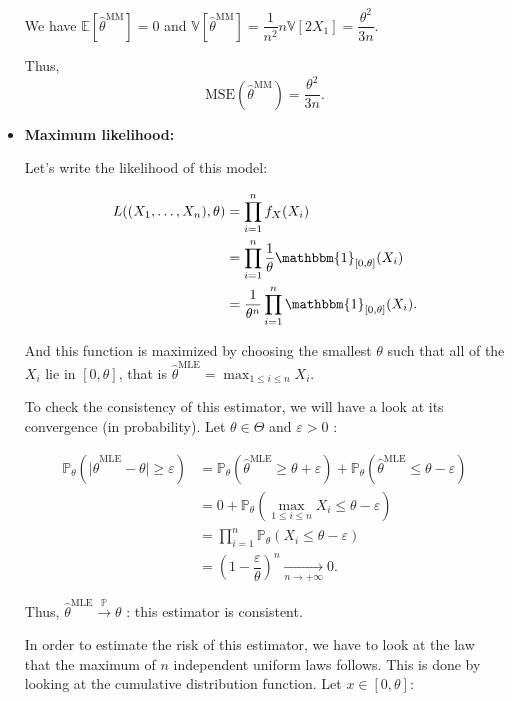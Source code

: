 \begin{itemize}
We have $\mathbb{E}[\hat{\theta}^{\text{MM}}] = 0$ and $\mathbb{V}[\hat{\theta}^{\text{MM}}] = \dfrac{1}{n^2}n\mathbb{V}[2X_1] = \dfrac{\theta^2}{3n}.$\newline

Thus, $$\text{MSE}(\hat{\theta}^{\text{MM}}) = \dfrac{\theta^2}{3n}.$$


\item \textbf{Maximum likelihood:}

Let's write the likelihood of this model:

\begin{align*}
    L((X_1,\dots,X_n), \theta) &= \displaystyle \prod_{i=1}^{n} f_X(X_i) \\
    &= \displaystyle \prod_{i=1}^{n} \dfrac{1}{\theta} \mathbbm{1}_{[0, \theta]}(X_i)\\
    &= \dfrac{1}{\theta^n} \prod_{i=1}^{n} \mathbbm{1}_{[0, \theta]}(X_i).
\end{align*}

And this function is maximized by choosing the smallest $\theta$ such that all of the $X_i$ lie in $[0, \theta]$, that is $\hat{\theta}^{\text{MLE}} = \max_{1\leq i \leq n} X_i.$\newline

To check the consistency of this estimator, we will have a look at its convergence (in probability). Let $\theta \in \Theta$ and $\varepsilon >0$ :

\begin{align*}
    \mathbb{P}_\theta(\lvert\hat{\theta}^{\text{MLE}} - \theta\rvert \ge \varepsilon) &= \mathbb{P}_\theta(\hat{\theta}^{\text{MLE}} \ge \theta + \varepsilon) + \mathbb{P}_\theta(\hat{\theta}^{\text{MLE}} \le \theta - \varepsilon)\\
    &= 0 + \mathbb{P}_\theta(\max_{1\leq i \leq n} X_i \le \theta - \varepsilon)\\
    &= \prod_{i=1}^{n} \mathbb{P}_\theta(X_i \le \theta - \varepsilon)\\
    &= \left(1 - \dfrac{\varepsilon}{\theta} \right)^n \underset{n\to +\infty}{\longrightarrow} 0.
\end{align*}


Thus, $\hat{\theta}^{\text{MLE}} \xrightarrow{\mathbb{P}} \theta$ : this estimator is consistent.\newline

In order to estimate the risk of this estimator, we have to look at the law that the maximum of $n$ independent uniform laws follows. This is done by looking at the cumulative distribution function. Let $x \in [0,\theta] :$


\end{itemize}
